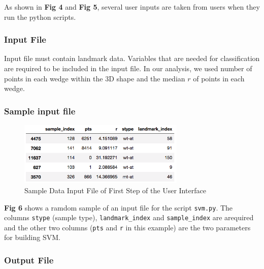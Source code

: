 \documentclass[10pt,letterpaper]{article}
\begin{document}
As shown in \textbf{Fig 4} and \textbf{Fig 5}, several user inputs are
taken from users when they run the python scripts.

\subsubsection{Input File}\label{input-file}

Input file must contain landmark data. Variables that are needed for
classification are required to be included in the input file. In our
analysis, we used number of points in each wedge within the 3D shape and
the median \(r\) of points in each wedge.

\subsubsection{Sample input file}\label{sample-input-file}

\begin{figure}[h]

{\centering \includegraphics[width=300px]{figures/Figure3} 

}

\caption{Sample Data Input File of First Step of the User Interface}\label{fig:inputdata2}
\end{figure}

\textbf{Fig 6} shows a ramdom sample of an input file for the script
\texttt{svm.py}. The columns \texttt{stype} (sample type),
\texttt{landmark\_index} and \texttt{sample\_index} are arequired and
the other two columns (\texttt{pts} and \texttt{r} in this example) are
the two parameters for building SVM.

\subsubsection{Output File}\label{output-file}
\end{document}
